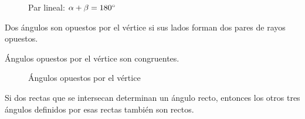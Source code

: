 \begin{figure}[!h]
    \centering
    
    \caption{Par lineal: $\alpha + \beta = 180^{\circ}$}
    \label{fig:linear-pair}
\end{figure}    

\begin{definition}
    Dos ángulos son opuestos por el vértice si sus lados forman dos pares de rayos opuestos.
\end{definition}

\begin{theorem}
    Ángulos opuestos por el vértice son congruentes.

    \begin{figure}[!h]
        \centering
        
        \caption{Ángulos opuestos por el vértice}
        \label{fig:vertex-angle}
    \end{figure}
    
\end{theorem}

\begin{theorem}
    Si dos rectas que se intersecan determinan un ángulo recto, entonces los otros tres ángulos definidos por esas rectas también son rectos.
\end{theorem}


